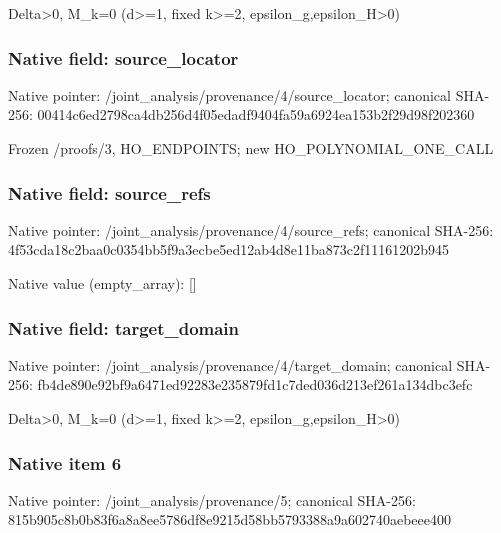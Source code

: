\documentclass[10pt,a4paper]{article}
\begin{document}
\begingroup\raggedright\sloppy Delta>0,\allowbreak{} M\_\allowbreak{}k=\allowbreak{}0 (d>=\allowbreak{}1,\allowbreak{} fixed k>=\allowbreak{}2,\allowbreak{} epsilon\_\allowbreak{}g,\allowbreak{}epsilon\_\allowbreak{}H>0)\par\endgroup

\subsubsection{Native field: source\_\allowbreak{}locator}
Native pointer: /joint\_\allowbreak{}analysis/provenance/4/source\_\allowbreak{}locator; canonical SHA-256: 00414c6ed2798ca4db256d4f05edadf9404fa59a6924ea153b2f29d98f202360

\begingroup\raggedright\sloppy Frozen /\allowbreak{}proofs/\allowbreak{}3,\allowbreak{} HO\_\allowbreak{}ENDPOINTS;\allowbreak{} new HO\_\allowbreak{}POLYNOMIAL\_\allowbreak{}ONE\_\allowbreak{}CALL\par\endgroup

\subsubsection{Native field: source\_\allowbreak{}refs}
Native pointer: /joint\_\allowbreak{}analysis/provenance/4/source\_\allowbreak{}refs; canonical SHA-256: 4f53cda18c2baa0c0354bb5f9a3ecbe5ed12ab4d8e11ba873c2f11161202b945

Native value (empty\_\allowbreak{}array): []

\subsubsection{Native field: target\_\allowbreak{}domain}
Native pointer: /joint\_\allowbreak{}analysis/provenance/4/target\_\allowbreak{}domain; canonical SHA-256: fb4de890e92bf9a6471ed92283e235879fd1c7ded036d213ef261a134dbc3efc

\begingroup\raggedright\sloppy Delta>0,\allowbreak{} M\_\allowbreak{}k=\allowbreak{}0 (d>=\allowbreak{}1,\allowbreak{} fixed k>=\allowbreak{}2,\allowbreak{} epsilon\_\allowbreak{}g,\allowbreak{}epsilon\_\allowbreak{}H>0)\par\endgroup

\subsubsection{Native item 6}
Native pointer: /joint\_\allowbreak{}analysis/provenance/5; canonical SHA-256: 815b905c8b0b83f6a8a8ee5786df8e9215d58bb5793388a9a602740aebeee400
\end{document}
